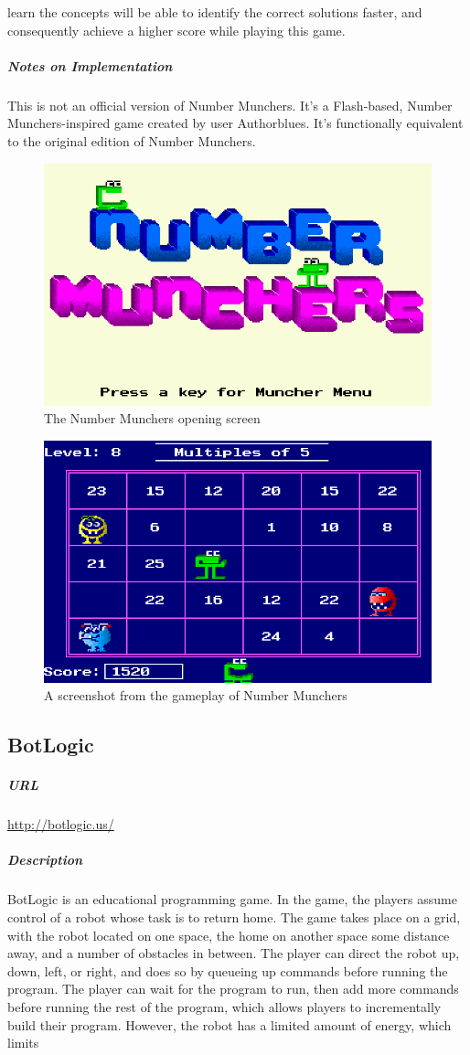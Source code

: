 learn the concepts will be able to identify the correct solutions faster, and consequently achieve a higher score while playing this game.\subparagraph{Notes on Implementation}This is not an official version of Number Munchers. It's a Flash-based, Number Munchers-inspired game created by user Authorblues. It's functionally equivalent to the original edition of Number Munchers.\newpage\begin{figure}[h!]\centering \includegraphics[height=0.33\textheight]{img/munchers_title.png}\caption{The Number Munchers opening screen}\end{figure}\begin{figure}[h!]\centering \includegraphics[height=0.33\textheight]{img/munchers_screen.png}\caption{A screenshot from the gameplay of Number Munchers}\end{figure}\subsection{BotLogic}\subparagraph{URL}\url{http://botlogic.us/}\subparagraph{Description}BotLogic is an educational programming game. In the game, the players assume control of a robot whose task is to return home. The game takes place on a grid, with the robot located on one space, the home on another space some distance away, and a number of obstacles in between. The player can direct the robot up, down, left, or right, and does so by queueing up commands before running the program. The player can wait for the program to run, then add more commands before running the rest of the program, which allows players to incrementally build their program. However, the robot has a limited amount of energy, which limits 